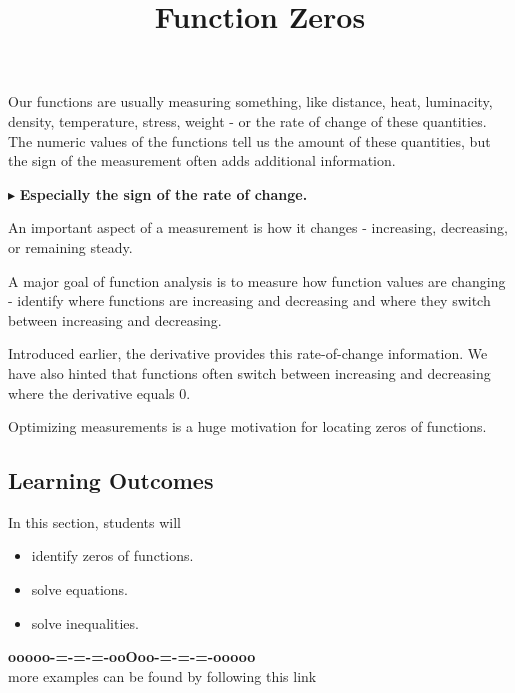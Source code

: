 \documentclass{ximera}
\title{Function Zeros}
\begin{document}
\begin{abstract}
\end{abstract}
\maketitle




Our functions are usually measuring something, like distance, heat, luminacity, density, temperature, stress, weight - or the rate of change of these quantities.  The numeric values of the functions tell us the amount of these quantities, but the sign of the measurement often adds additional information. 


$\blacktriangleright$ \textbf{\textcolor{blue!55!black}{Especially the sign of the rate of change.}}   



An important aspect of a measurement is how it changes - increasing, decreasing, or remaining steady. 





A major goal of function analysis is to measure how function values are changing - identify where functions are increasing and decreasing and where they switch between increasing and decreasing.




Introduced earlier, the derivative provides this rate-of-change information.  We have also hinted that functions often switch between increasing and decreasing where the derivative equals $0$.


Optimizing measurements is a huge motivation for locating zeros of functions.







\subsection*{Learning Outcomes}


\begin{sectionOutcomes}
In this section, students will 

\begin{itemize}
\item identify zeros of functions.
\item solve equations.
\item solve inequalities.
\end{itemize}
\end{sectionOutcomes}

















\begin{center}
\textbf{\textcolor{green!50!black}{ooooo-=-=-=-ooOoo-=-=-=-ooooo}} \\

more examples can be found by following this link\\ 

\end{center}
\end{document}
